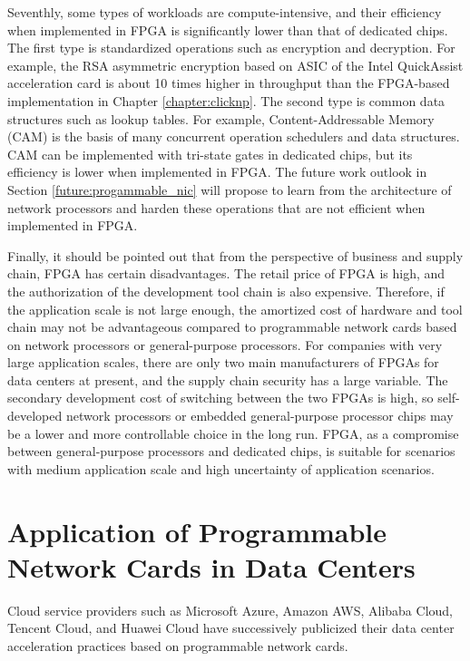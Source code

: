 Seventhly, some types of workloads are compute-intensive, and their efficiency when implemented in FPGA is significantly lower than that of dedicated chips.
The first type is standardized operations such as encryption and decryption. For example, the RSA asymmetric encryption based on ASIC of the Intel QuickAssist acceleration card \cite{intel-qat} is about 10 times higher in throughput than the FPGA-based implementation in Chapter \ref{chapter:clicknp}.
The second type is common data structures such as lookup tables. For example, Content-Addressable Memory (CAM) is the basis of many concurrent operation schedulers and data structures. CAM can be implemented with tri-state gates in dedicated chips, but its efficiency is lower when implemented in FPGA.
The future work outlook in Section \ref{future:progammable_nic} will propose to learn from the architecture of network processors and harden these operations that are not efficient when implemented in FPGA.

Finally, it should be pointed out that from the perspective of business and supply chain, FPGA has certain disadvantages. The retail price of FPGA is high, and the authorization of the development tool chain is also expensive. Therefore, if the application scale is not large enough, the amortized cost of hardware and tool chain may not be advantageous compared to programmable network cards based on network processors or general-purpose processors. For companies with very large application scales, there are only two main manufacturers of FPGAs for data centers at present, and the supply chain security has a large variable. The secondary development cost of switching between the two FPGAs is high, so self-developed network processors or embedded general-purpose processor chips may be a lower and more controllable choice in the long run. FPGA, as a compromise between general-purpose processors and dedicated chips, is suitable for scenarios with medium application scale and high uncertainty of application scenarios.

\section{Application of Programmable Network Cards in Data Centers}
\label{background:sec:application}

Cloud service providers such as Microsoft Azure, Amazon AWS, Alibaba Cloud, Tencent Cloud, and Huawei Cloud have successively publicized their data center acceleration practices based on programmable network cards.

